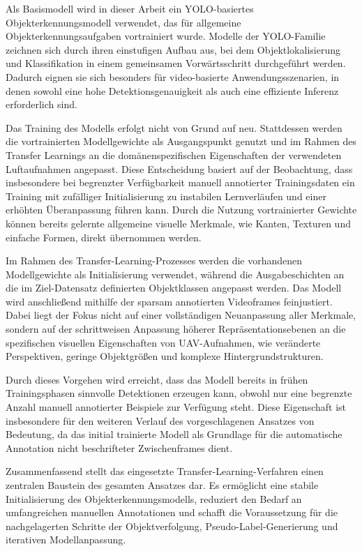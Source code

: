 Als Basismodell wird in dieser Arbeit ein YOLO-basiertes Objekterkennungsmodell
verwendet, das für allgemeine Objekterkennungsaufgaben vortrainiert wurde. Modelle
der YOLO-Familie zeichnen sich durch ihren einstufigen Aufbau aus, bei dem
Objektlokalisierung und Klassifikation in einem gemeinsamen Vorwärtsschritt
durchgeführt werden. Dadurch eignen sie sich besonders für video-basierte
Anwendungsszenarien, in denen sowohl eine hohe Detektionsgenauigkeit als auch eine
effiziente Inferenz erforderlich sind.

Das Training des Modells erfolgt nicht von Grund auf neu. Stattdessen werden die
vortrainierten Modellgewichte als Ausgangspunkt genutzt und im Rahmen des Transfer
Learnings an die domänenspezifischen Eigenschaften der verwendeten Luftaufnahmen
angepasst. Diese Entscheidung basiert auf der Beobachtung, dass insbesondere bei
begrenzter Verfügbarkeit manuell annotierter Trainingsdaten ein Training mit
zufälliger Initialisierung zu instabilen Lernverläufen und einer erhöhten
Überanpassung führen kann. Durch die Nutzung vortrainierter Gewichte können bereits
gelernte allgemeine visuelle Merkmale, wie Kanten, Texturen und einfache Formen,
direkt übernommen werden.

Im Rahmen des Transfer-Learning-Prozesses werden die vorhandenen Modellgewichte als
Initialisierung verwendet, während die Ausgabeschichten an die im Ziel-Datensatz
definierten Objektklassen angepasst werden. Das Modell wird anschließend mithilfe
der sparsam annotierten Videoframes feinjustiert. Dabei liegt der Fokus nicht auf
einer vollständigen Neuanpassung aller Merkmale, sondern auf der schrittweisen
Anpassung höherer Repräsentationsebenen an die spezifischen visuellen Eigenschaften
von UAV-Aufnahmen, wie veränderte Perspektiven, geringe Objektgrößen und komplexe
Hintergrundstrukturen.

Durch dieses Vorgehen wird erreicht, dass das Modell bereits in frühen
Trainingsphasen sinnvolle Detektionen erzeugen kann, obwohl nur eine begrenzte
Anzahl manuell annotierter Beispiele zur Verfügung steht. Diese Eigenschaft ist
insbesondere für den weiteren Verlauf des vorgeschlagenen Ansatzes von Bedeutung,
da das initial trainierte Modell als Grundlage für die automatische Annotation
nicht beschrifteter Zwischenframes dient.

Zusammenfassend stellt das eingesetzte Transfer-Learning-Verfahren einen zentralen
Baustein des gesamten Ansatzes dar. Es ermöglicht eine stabile Initialisierung des
Objekterkennungsmodells, reduziert den Bedarf an umfangreichen manuellen
Annotationen und schafft die Voraussetzung für die nachgelagerten Schritte der
Objektverfolgung, Pseudo-Label-Generierung und iterativen Modellanpassung.
